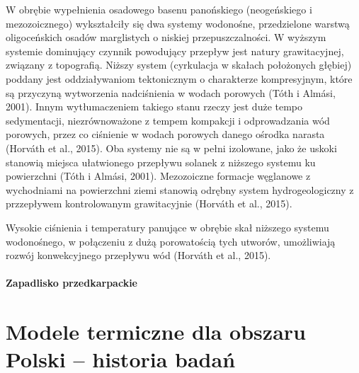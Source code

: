 \documentclass[11.5pt,twoside]{report}
\begin{document}
 W obrębie wypełnienia osadowego basenu panońskiego (neogeńskiego i mezozoicznego) wykształciły się dwa systemy wodonośne, przedzielone warstwą oligoceńskich osadów marglistych o niskiej przepuszczalności. W wyższym systemie dominujący czynnik powodujący przepływ jest natury grawitacyjnej, związany z topografią. Niższy system (cyrkulacja w skałach położonych głębiej) poddany jest oddziaływaniom tektonicznym o charakterze kompresyjnym, które są przyczyną wytworzenia nadciśnienia w wodach porowych (T\'{o}th i Alm\'{a}si, 2001). Innym wytłumaczeniem takiego stanu rzeczy jest duże tempo sedymentacji, niezrównoważone z tempem kompakcji i odprowadzania wód porowych, przez co ciśnienie w wodach porowych danego ośrodka narasta (Horv\'{a}th et al., 2015). Oba systemy nie są w pełni izolowane, jako że uskoki stanowią miejsca ułatwionego przepływu solanek z niższego systemu ku powierzchni (T\'{o}th i Alm\'{a}si, 2001). Mezozoiczne formacje węglanowe z wychodniami na powierzchni ziemi stanowią odrębny system hydrogeologiczny z przzepływem kontrolowanym grawitacyjnie (Horv\'{a}th et al., 2015). 
 
 Wysokie ciśnienia i temperatury panujące w obrębie skał niższego systemu wodonośnego, w połączeniu z dużą porowatością tych utworów, umożliwiają rozwój konwekcyjnego przepływu wód (Horv\'{a}th et al., 2015). 
 
 \subsubsection{Zapadlisko przedkarpackie}
 
 	\chapter{Modele termiczne dla obszaru Polski -- historia badań}
 
 
 
 
\end{document}
